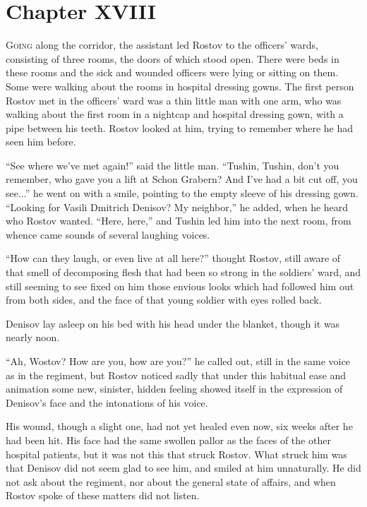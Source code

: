 \chapter*{Chapter XVIII}
\ifaudio     
{} 
\fi

\lettrine[lines=2, loversize=0.3, lraise=0]{\initfamily G}{oing}
along the corridor, the assistant led Rostov to the
officers' wards, consisting of three rooms, the doors of which
stood open. There were beds in these rooms and the sick and
wounded officers were lying or sitting on them. Some were walking
about the rooms in hospital dressing gowns. The first person
Rostov met in the officers' ward was a thin little man with one
arm, who was walking about the first room in a nightcap and
hospital dressing gown, with a pipe between his teeth.  Rostov
looked at him, trying to remember where he had seen him before.

``See where we've met again!'' said the little man. ``Tushin,
Tushin, don't you remember, who gave you a lift at Schon Grabern?
And I've had a bit cut off, you see...'' he went on with a smile,
pointing to the empty sleeve of his dressing gown. ``Looking for
Vasili Dmitrich Denisov? My neighbor,'' he added, when he heard
who Rostov wanted. ``Here, here,'' and Tushin led him into the
next room, from whence came sounds of several laughing voices.

``How can they laugh, or even live at all here?'' thought Rostov,
still aware of that smell of decomposing flesh that had been so
strong in the soldiers' ward, and still seeming to see fixed on
him those envious looks which had followed him out from both
sides, and the face of that young soldier with eyes rolled back.

Denisov lay asleep on his bed with his head under the blanket,
though it was nearly noon.

``Ah, Wostov? How are you, how are you?'' he called out, still in
the same voice as in the regiment, but Rostov noticed sadly that
under this habitual ease and animation some new, sinister, hidden
feeling showed itself in the expression of Denisov's face and the
intonations of his voice.

His wound, though a slight one, had not yet healed even now, six
weeks after he had been hit. His face had the same swollen pallor
as the faces of the other hospital patients, but it was not this
that struck Rostov.  What struck him was that Denisov did not
seem glad to see him, and smiled at him unnaturally. He did not
ask about the regiment, nor about the general state of affairs,
and when Rostov spoke of these matters did not listen.

